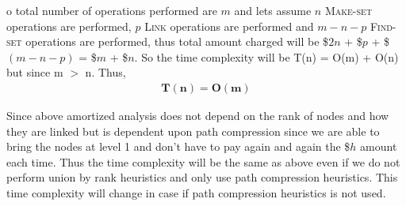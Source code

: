 \documentclass[a4paper,11pt]{article}
\theoremstyle{quest}
\newenvironment{solution}[2][Solution]{\begin{trivlist}
		\item[\hskip \labelsep {\bfseries #1}\hskip \labelsep {\bfseries #2.}]}{\end{trivlist}}
\begin{document}
\begin{solution}
So total number of operations performed are $m$ and lets assume $n$ \textsc{Make-set} operations are performed, $p$ \textsc{Link} operations are performed and $m-n-p$ \textsc{Find-set} operations are performed, thus total amount charged will be \$$2n$ + \$$p$ + \$$(m-n-p)$ = \$$m$ + \$$n$. So the time complexity will be T(n) = O(m) + O(n) but since m $>$ n. Thus,
\begin{align*}
\boxed{\mathbf{T(n) = O(m)}}
\end{align*}

Since above amortized analysis does not depend on the rank of nodes and how they are linked but is dependent upon path compression since we are able to bring the nodes at level 1 and don't have to pay again and again the \$$h$ amount each time. Thus the time complexity will be the same as above even if we do not perform union by rank heuristics and only use path compression heuristics. This time complexity will change in case if path compression heuristics is not used.  
	
\end{solution}
\newpage
\end{document}
